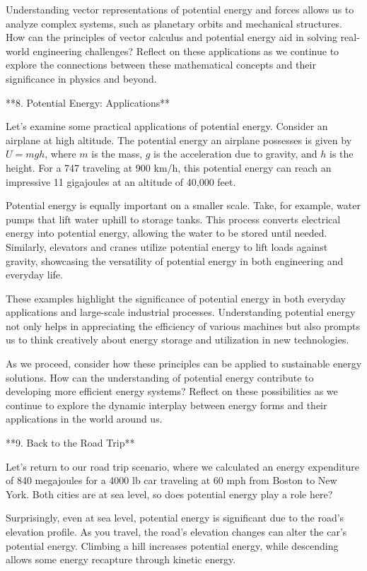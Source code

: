 \begin{tcolorbox}[size=title,opacityfill=0.05,breakable]
Understanding vector representations of potential energy and forces allows us to analyze complex systems, such as planetary orbits and mechanical structures. How can the principles of vector calculus and potential energy aid in solving real-world engineering challenges? Reflect on these applications as we continue to explore the connections between these mathematical concepts and their significance in physics and beyond.

**8. Potential Energy: Applications**

Let's examine some practical applications of potential energy. Consider an airplane at high altitude. The potential energy an airplane possesses is given by \( U = mgh \), where \( m \) is the mass, \( g \) is the acceleration due to gravity, and \( h \) is the height. For a 747 traveling at 900 km/h, this potential energy can reach an impressive 11 gigajoules at an altitude of 40,000 feet. 

Potential energy is equally important on a smaller scale. Take, for example, water pumps that lift water uphill to storage tanks. This process converts electrical energy into potential energy, allowing the water to be stored until needed. Similarly, elevators and cranes utilize potential energy to lift loads against gravity, showcasing the versatility of potential energy in both engineering and everyday life.

These examples highlight the significance of potential energy in both everyday applications and large-scale industrial processes. Understanding potential energy not only helps in appreciating the efficiency of various machines but also prompts us to think creatively about energy storage and utilization in new technologies.

As we proceed, consider how these principles can be applied to sustainable energy solutions. How can the understanding of potential energy contribute to developing more efficient energy systems? Reflect on these possibilities as we continue to explore the dynamic interplay between energy forms and their applications in the world around us.

**9. Back to the Road Trip**

Let's return to our road trip scenario, where we calculated an energy expenditure of 840 megajoules for a 4000 lb car traveling at 60 mph from Boston to New York. Both cities are at sea level, so does potential energy play a role here?

Surprisingly, even at sea level, potential energy is significant due to the road's elevation profile. As you travel, the road's elevation changes can alter the car's potential energy. Climbing a hill increases potential energy, while descending allows some energy recapture through kinetic energy.


\end{tcolorbox}

